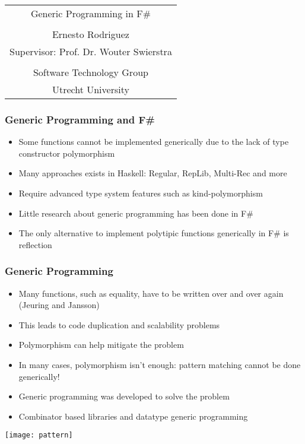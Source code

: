 \documentclass{beamer}
\begin{document}
\begin{frame}

  \begin{tabular}{c}
    {\color{blue}\Huge Generic Programming in F\#} \\
    \\
    Ernesto Rodriguez \\
    Supervisor: Prof. Dr. Wouter Swierstra \\
    \\
    Software Technology Group\\
    Utrecht University
    
  \end{tabular}
  
\end{frame}

\begin{frame}
  \frametitle{Generic Programming and F\#}

  \begin{itemize}
  \item Some functions cannot be implemented generically due to the
    lack of type constructor polymorphism
  \item Many approaches exists in Haskell: Regular, RepLib, Multi-Rec
    and more
  \item Require advanced type system features such as
    kind-polymorphism
  \item Little research about generic programming has been done in F\#
  \item The only alternative to implement polytipic functions
    generically in F\# is reflection
  \end{itemize}
    
\end{frame}

\begin{frame}

  \frametitle{Generic Programming}

  \begin{itemize}
  \item Many functions, such as equality, have to be written over and
    over again (Jeuring and Jansson)
  \item This leads to code duplication and scalability problems
  \item Polymorphism can help mitigate the problem
  \item In many cases, polymorphism isn't enough: pattern matching
    cannot be done generically!
  \item Generic programming was developed to solve the problem
  \item Combinator based libraries and datatype generic programming
  \end{itemize}

  \centering \texttt{[image: pattern]} \\
    
\end{frame}
\end{document}
